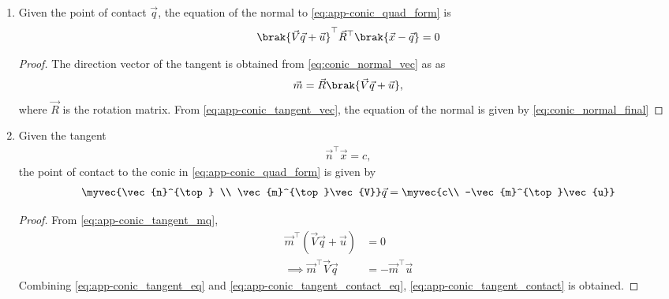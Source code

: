 \begin{enumerate}[label=\thesubsection.\arabic*.,ref=\thesubsection.\theenumi]
\begin{proof}
\begin{align}
    \brak{\vec{V}\vec{q}+\vec{u}}^{\top}\brak{\vec{x}-\vec{q}} &=0
    \\
    \implies \brak{\vec{V}\vec{q}+\vec{u}}^{\top}\vec{x}-\vec{q}^{\top}\vec{V}\vec{q}-\vec{u}^{\top}\vec{q} &= 0
    \end{align}
    which, upon substituting from \eqref{eq:app-conic_tangent_qquad} and simplifying yields 
  \eqref{eq:app-conic_tangent_final}
\end{proof}
\item
  Given the point of contact $\vec{q}$, the equation of the normal to \eqref{eq:app-conic_quad_form} is 
  \begin{align}
    \brak{\vec{V}\vec{q}+\vec{u}}^{\top}\vec{R}^{\top}\brak{\vec{x}-\vec{q}} =0
  \end{align}
\begin{proof}
  The direction vector of the tangent is obtained from 
  \eqref{eq:conic_normal_vec} as
  as
  \begin{align}
  \label{eq:app-conic_tangent_vec}
  \vec{m} = \vec{R}\brak{\vec{V}\vec{q}+\vec{u}}, 
  \end{align}  
  where $\vec{R}$ is the rotation matrix.
  From \eqref{eq:app-conic_tangent_vec}, the equation of the normal is
  given by 
  \eqref{eq:conic_normal_final}
\end{proof}

\item Given the tangent 
\begin{align}
  \label{eq:app-conic_tangent_eq}
\vec{n}^{\top}\vec{x} = c,
\end{align}
the point of  contact to the conic in \eqref{eq:app-conic_quad_form} is given by 
\begin{align}
  \label{eq:app-conic_tangent_contact}
        \myvec{\vec{n}^{\top} \\ \vec{m}^{\top}\vec{V}} \vec{q} = \myvec{c\\ -\vec{m}^{\top}\vec{u}}
\end{align}
		\begin{proof}
			From
  \eqref{eq:app-conic_tangent_mq},
\begin{align}
	\vec{m}^{\top}(\vec{V}\vec{q}+\vec{u})&=0
	\\
	\implies        \vec{m}^{\top}\vec{V}\vec{q} &= -\vec{m}^{\top}\vec{u}
  \label{eq:app-conic_tangent_contact_eq}
\end{align}
Combining 
  \eqref{eq:app-conic_tangent_eq}
  and 
  \eqref{eq:app-conic_tangent_contact_eq}, 
  \eqref{eq:app-conic_tangent_contact} is obtained.


\end{proof}
\end{enumerate}
